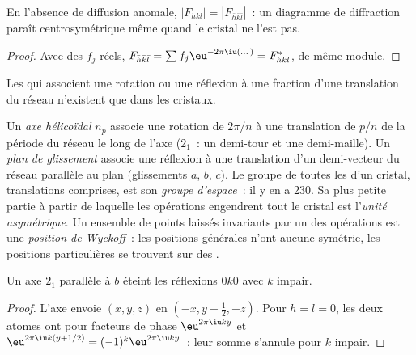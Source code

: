 \begin{proposition}\label{prop:b3:x-ray-diffraction:friedel}
En l'absence de diffusion anomale, $|F_{hkl}| = |F_{\bar h\bar k\bar l}|$~:
un diagramme de diffraction paraît centrosymétrique même quand le
cristal ne l'est pas.
\end{proposition}

\begin{proof}
Avec des $f_j$ réels, $F_{\bar h\bar k\bar l} = \sum f_j\eu^{-2\pi\iu(\dots)} = F_{hkl}^*$,
de même module.
\end{proof}

Les  qui associent une rotation ou une réflexion à
une fraction d'une translation du réseau n'existent que dans les
cristaux.

\begin{definition}\label{def:b3:x-ray-diffraction:space-group}
Un \emph{axe hélicoïdal} $n_p$ associe
une rotation de $2\pi/n$ à une translation de $p/n$ de la période du
réseau le long de l'axe ($2_1$~: un demi-tour et une demi-maille). Un
\emph{plan de glissement} associe une réflexion
à une translation d'un demi-vecteur du réseau parallèle au plan
(glissements $a$, $b$, $c$).
Le groupe de toutes les  d'un cristal,
translations comprises, est son \emph{groupe d'espace}~:
il y en a 230. Sa plus petite partie à partir de laquelle les opérations
engendrent tout le cristal est l'\emph{unité asymétrique}.
Un ensemble de points laissés invariants par un  des
opérations est une \emph{position de Wyckoff}~:
les positions générales n'ont aucune symétrie, les positions
particulières se trouvent sur des .
\end{definition}

\begin{proposition}\label{prop:b3:x-ray-diffraction:screw-absence}
Un axe $2_1$ parallèle à $b$ éteint les réflexions $0k0$ avec $k$ impair.
\end{proposition}

\begin{proof}
L'axe envoie $(x, y, z)$ en $(-x, y + \frac12, -z)$. Pour $h = l = 0$, les
deux atomes ont pour facteurs de phase $\eu^{2\pi\iu ky}$ et
$\eu^{2\pi\iu k(y + 1/2)} = (-1)^k\eu^{2\pi\iu ky}$~: leur somme
s'annule pour $k$ impair.
\end{proof}

